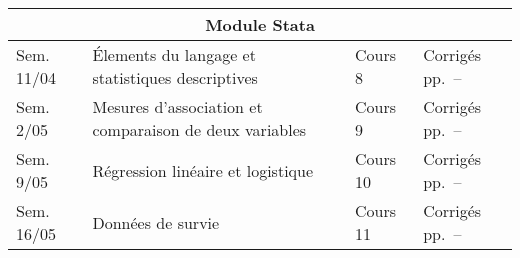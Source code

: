 \documentclass[11pt]{report}
\theoremstyle{definition}
\newcommand{\blankpage}{
  \newpage
  \thispagestyle{empty}
  \mbox{}
  \newpage
  }
\begin{document}
\begin{center}
\begin{tabular}{|l|p{10cm}|l|l|}
\hline
  \multicolumn{4}{|c|}{Module Stata} \\
\hline
  Sem. 11/04 & Élements du langage et statistiques descriptives & Cours 8 &
  Corrigés pp.~\pageref{start:sol1stata}–\pageref{stop:sol1stata}\\
  Sem. 2/05 & Mesures d'association et comparaison de deux variables &
  Cours 9 & Corrigés pp.~\pageref{start:sol2stata}–\pageref{stop:sol2stata}\\
  Sem. 9/05 & Régression linéaire et logistique & Cours 10 & Corrigés pp.~\pageref{start:sol3stata}–\pageref{stop:sol3stata}\\
  Sem. 16/05 & Données de survie & Cours 11 & Corrigés pp.~\pageref{start:sol4stata}–\pageref{stop:sol4stata}\\
\hline
\end{tabular}
\end{center}


\setcounter{page}{1}


\cleardoublepage

\blankpage
\blankpage

\thispagestyle{empty}
\end{document}
